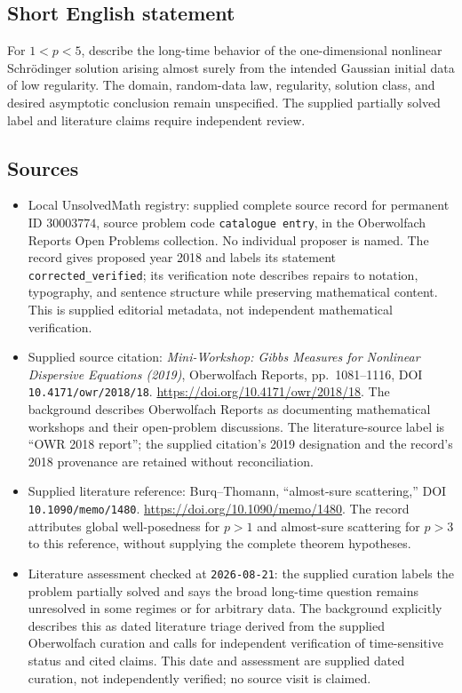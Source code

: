 \documentclass[11pt]{article}
\begin{document}
\subsection{Short English statement}
For \(1<p<5\), describe the long-time behavior of the one-dimensional nonlinear Schrödinger solution arising almost surely from the intended Gaussian initial data of low regularity. The domain, random-data law, regularity, solution class, and desired asymptotic conclusion remain unspecified. The supplied partially solved label and literature claims require independent review.
\subsection{Sources}
\begin{itemize}
\item Local UnsolvedMath registry: supplied complete source record for permanent ID \(30003774\), source problem code \texttt{catalogue entry}, in the Oberwolfach Reports Open Problems collection. No individual proposer is named. The record gives proposed year 2018 and labels its statement \texttt{corrected\_verified}; its verification note describes repairs to notation, typography, and sentence structure while preserving mathematical content. This is supplied editorial metadata, not independent mathematical verification.
\item Supplied source citation: \emph{Mini-Workshop: Gibbs Measures for Nonlinear Dispersive Equations (2019)}, Oberwolfach Reports, pp.\ 1081--1116, DOI \texttt{10.4171/owr/2018/18}. \url{https://doi.org/10.4171/owr/2018/18}. The background describes Oberwolfach Reports as documenting mathematical workshops and their open-problem discussions. The literature-source label is ``OWR 2018 report''; the supplied citation's 2019 designation and the record's 2018 provenance are retained without reconciliation.
\item Supplied literature reference: Burq--Thomann, ``almost-sure scattering,'' DOI \texttt{10.1090/memo/1480}. \url{https://doi.org/10.1090/memo/1480}. The record attributes global well-posedness for \(p>1\) and almost-sure scattering for \(p>3\) to this reference, without supplying the complete theorem hypotheses.
\item Literature assessment checked at \texttt{2026-08-21}: the supplied curation labels the problem partially solved and says the broad long-time question remains unresolved in some regimes or for arbitrary data. The background explicitly describes this as dated literature triage derived from the supplied Oberwolfach curation and calls for independent verification of time-sensitive status and cited claims. This date and assessment are supplied dated curation, not independently verified; no source visit is claimed.
\end{itemize}
\end{document}
